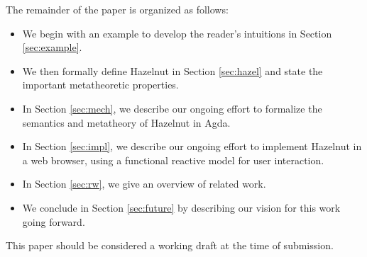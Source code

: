 The remainder of the paper is organized as follows:
\begin{itemize}
  \item We begin with an example to develop the reader's intuitions in Section
    \ref{sec:example}.

  \item We then formally define Hazelnut in Section \ref{sec:hazel} and state the important metatheoretic properties.

  \item In Section \ref{sec:mech}, we describe our ongoing effort to formalize the semantics and metatheory of Hazelnut in Agda.

  \item In Section \ref{sec:impl}, we describe our ongoing effort to implement Hazelnut in a web browser, using a functional reactive model for user interaction.
  \item In Section \ref{sec:rw}, we give an overview of related work.
  \item We conclude in Section \ref{sec:future} by describing our vision for this work going 
    forward.
\end{itemize}

This paper should be considered a working draft at the time of submission.
